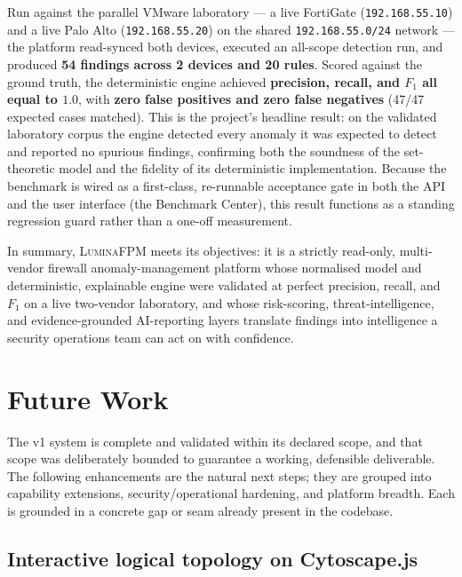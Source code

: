 Run against the parallel VMware laboratory --- a live FortiGate (\texttt{192.168.55.10}) and a live Palo Alto (\texttt{192.168.55.20}) on the shared \texttt{192.168.55.0/24} network --- the platform read-synced both devices, executed an all-scope detection run, and produced \textbf{54 findings across 2 devices and 20 rules}. Scored against the ground truth, the deterministic engine achieved \textbf{precision, recall, and $F_1$ all equal to $1.0$}, with \textbf{zero false positives and zero false negatives} (47/47 expected cases matched). This is the project's headline result: on the validated laboratory corpus the engine detected every anomaly it was expected to detect and reported no spurious findings, confirming both the soundness of the set-theoretic model and the fidelity of its deterministic implementation. Because the benchmark is wired as a first-class, re-runnable acceptance gate in both the API and the user interface (the Benchmark Center), this result functions as a standing regression guard rather than a one-off measurement.

In summary, \textsc{LuminaFPM} meets its objectives: it is a strictly read-only, multi-vendor firewall anomaly-management platform whose normalised model and deterministic, explainable engine were validated at perfect precision, recall, and $F_1$ on a live two-vendor laboratory, and whose risk-scoring, threat-intelligence, and evidence-grounded AI-reporting layers translate findings into intelligence a security operations team can act on with confidence.

\section{Future Work}
\label{sec:ch5-future}

The v1 system is complete and validated within its declared scope, and that scope was deliberately bounded to guarantee a working, defensible deliverable. The following enhancements are the natural next steps; they are grouped into capability extensions, security/operational hardening, and platform breadth. Each is grounded in a concrete gap or seam already present in the codebase.

\subsection{Interactive logical topology on Cytoscape.js}
\label{sec:ch5-cytoscape}

